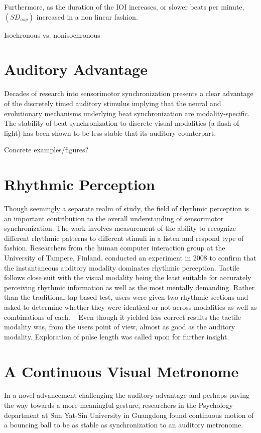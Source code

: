 Furthermore, as the duration of the IOI increases, or slower beats per minute, $(SD_{asy})$ increased in a non linear fashion. 

Isochronous vs. nonisochronous ~\cite{polak2016both}


\section{Auditory Advantage}
Decades of research into sensorimotor synchronization presents a clear advantage of the discretely timed auditory stimulus implying that the neural and evolutionary mechanisms underlying beat synchronization are modality-specific.
~\cite{gan2015synchronization} The stability of beat synchronization to discrete visual modalities (a flash of light) has been shown to be less stable that its auditory counterpart.

Concrete examples/figures?

\section{Rhythmic Perception}
Though seemingly a separate realm of study, the field of rhythmic perception is an important contribution to the overall understanding of sensorimotor synchronization. The work involves measurement of the ability to recognize different rhythmic patterns to different stimuli in a listen and respond type of fashion. Researchers from the human computer interaction group at the University of Tampere, Finland, conducted an experiment in 2008 to confirm that the instantaneous auditory modality dominates rhythmic perception. Tactile follows close suit with the visual modality being the least suitable for accurately perceiving rhythmic information as well as the most mentally demanding. Rather than the traditional tap based test, users were given two rhythmic sections and asked to determine whether they were identical or not across modalities as well as combinations of each. ~\cite{jokiniemi2008crossmodal} Even though it yielded less correct results the tactile modality was, from the users point of view, almost as good as the auditory modality. Exploration of pulse length was called upon for further insight.

\section{A Continuous Visual Metronome} \label{visualMet}
In a novel advancement challenging the auditory advantage and perhaps paving the way towards a more meaningful gesture, researchers in the Psychology department at Sun Yat-Sin University in Guangdong found continuous motion of a bouncing ball to be as stable as synchronization to an auditory metronome.
~\cite{gan2015synchronization}


